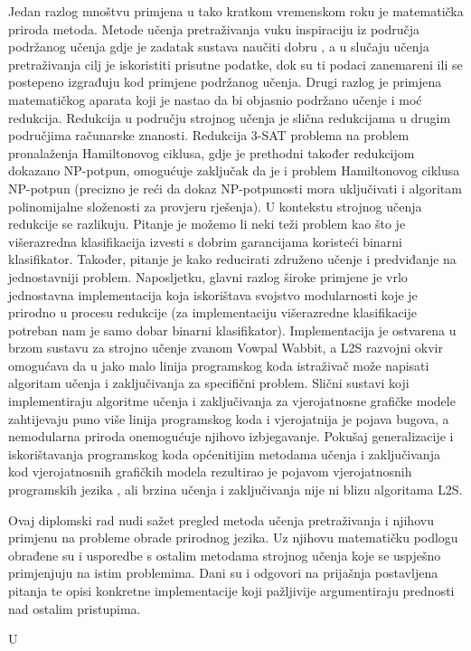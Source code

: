 Jedan razlog mnoštvu primjena u tako kratkom vremenskom roku je matematička
priroda metoda. Metode učenja pretraživanja vuku inspiraciju iz područja
podržanog učenja  gdje je zadatak sustava
naučiti dobru , a u slučaju učenja
pretraživanja cilj je iskoristiti prisutne podatke, dok su ti podaci zanemareni
ili se postepeno izgrađuju kod primjene podržanog učenja. Drugi razlog je
primjena matematičkog aparata koji je nastao da bi objasnio podržano učenje i
moć redukcija. Redukcija u području strojnog učenja je slična redukcijama u
drugim područjima računarske znanosti. Redukcija 3-SAT problema na problem
pronalaženja Hamiltonovog ciklusa, gdje je prethodni također redukcijom dokazano
NP-potpun, omogućuje zaključak da je i problem Hamiltonovog ciklusa NP-potpun
(precizno je reći da dokaz NP-potpunosti mora uključivati i algoritam
polinomijalne složenosti za provjeru rješenja). U kontekstu strojnog učenja
redukcije se razlikuju. Pitanje je možemo li neki teži problem kao što je
višerazredna klasifikacija izvesti s dobrim garancijama koristeći binarni
klasifikator. Također, pitanje je kako reducirati združeno učenje i predviđanje
 na jednostavniji problem. Naposljetku,
glavni razlog široke primjene je vrlo jednostavna implementacija koja
iskorištava svojstvo modularnosti koje je prirodno u procesu redukcije (za
implementaciju višerazredne klasifikacije potreban nam je samo dobar binarni
klasifikator). Implementacija je ostvarena u brzom sustavu za strojno učenje
zvanom Vowpal Wabbit, a \textsc{L2S} razvojni okvir omogućava da u jako malo
linija programskog koda istraživač može napisati algoritam učenja i
zaključivanja za specifični problem. Slični sustavi koji implementiraju
algoritme učenja i zaključivanja za vjerojatnosne grafičke modele zahtijevaju
puno više linija programskog koda i vjerojatnija je pojava bugova, a nemodularna
priroda onemogućuje njihovo izbjegavanje. Pokušaj generalizacije i
iskorištavanja programskog koda općenitijim metodama učenja i zaključivanja kod
vjerojatnosnih grafičkih modela rezultirao je pojavom vjerojatnosnih
programskih jezika , ali brzina
učenja i zaključivanja nije ni blizu algoritama \textsc{L2S}.

Ovaj diplomski rad nudi sažet pregled metoda učenja pretraživanja i njihovu
primjenu na probleme obrade prirodnog jezika. Uz njihovu matematičku podlogu
obrađene su i usporedbe s ostalim metodama strojnog učenja koje se uspješno
primjenjuju na istim problemima. Dani su i odgovori na prijašnja postavljena
pitanja te opisi konkretne implementacije koji pažljivije argumentiraju
prednosti nad ostalim pristupima.

U 
